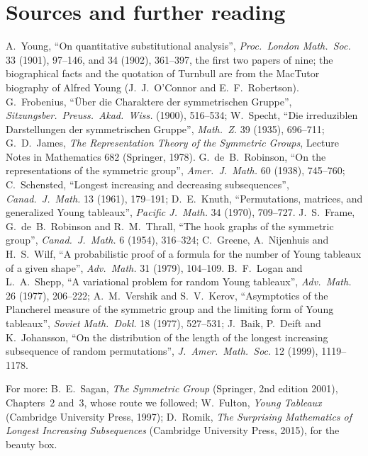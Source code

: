 \section*{Sources and further reading}

A.~Young, ``On quantitative substitutional analysis'', \emph{Proc.\ London Math.\ Soc.} 33 (1901), 97--146, and 34 (1902), 361--397, the first two papers of nine; the biographical facts and the quotation of Turnbull are from the MacTutor
biography of Alfred Young (J.~J.~O'Connor and E.~F.~Robertson). G.~Frobenius, ``Über die Charaktere der symmetrischen Gruppe'', \emph{Sitzungsber.\ Preuss.\ Akad.\ Wiss.} (1900), 516--534; W.~Specht, ``Die irreduziblen Darstellungen der
symmetrischen Gruppe'', \emph{Math.\ Z.} 39 (1935), 696--711; G.~D.~James, \emph{The Representation Theory of the Symmetric Groups}, Lecture Notes in Mathematics 682 (Springer, 1978). G.~de~B.~Robinson, ``On the representations of the symmetric
group'', \emph{Amer.\ J.\ Math.} 60 (1938), 745--760; C.~Schensted, ``Longest increasing and decreasing subsequences'', \emph{Canad.\ J.\ Math.} 13 (1961), 179--191; D.~E.~Knuth, ``Permutations, matrices, and generalized Young tableaux'',
\emph{Pacific J.\ Math.} 34 (1970), 709--727. J.~S.~Frame, G.~de~B.~Robinson and R.~M.~Thrall, ``The hook graphs of the symmetric group'', \emph{Canad.\ J.\ Math.} 6 (1954), 316--324; C.~Greene, A.~Nijenhuis and H.~S.~Wilf, ``A probabilistic proof of a
formula for the number of Young tableaux of a given shape'', \emph{Adv.\ Math.} 31 (1979), 104--109. B.~F.~Logan and L.~A.~Shepp, ``A variational problem for random Young tableaux'', \emph{Adv.\ Math.} 26 (1977), 206--222; A.~M.~Vershik and S.~V.~Kerov,
``Asymptotics of the Plancherel measure of the symmetric group and the limiting form of Young tableaux'', \emph{Soviet Math.\ Dokl.} 18 (1977), 527--531; J.~Baik, P.~Deift and K.~Johansson, ``On the distribution of the length of the longest increasing
subsequence of random permutations'', \emph{J.\ Amer.\ Math.\ Soc.} 12 (1999), 1119--1178.

For more: B.~E.~Sagan, \emph{The Symmetric Group} (Springer, 2nd edition 2001), Chapters~2 and~3, whose route we followed; W.~Fulton, \emph{Young Tableaux} (Cambridge University Press, 1997); D.~Romik, \emph{The Surprising Mathematics of Longest
Increasing Subsequences} (Cambridge University Press, 2015), for the beauty box.
